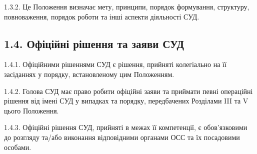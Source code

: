     1.3.2. Це Положення визначає мету, принципи, порядок формування, структуру, повноваження, порядок роботи та інші аспекти діяльності СУД.

\subsection*{1.4. Офіційні рішення та заяви СУД}
    1.4.1. Офіційними рішеннями СУД є рішення, прийняті колегіально на її засіданнях у порядку, встановленому цим Положенням.

    1.4.2. Голова СУД має право робити офіційні заяви та приймати певні операційні рішення від імені СУД у випадках та порядку, передбачених Розділами III та V цього Положення.

    1.4.3. Офіційні рішення СУД, прийняті в межах її компетенції, є обов'язковими до розгляду та/або виконання відповідними органами ОСС та їх посадовими особами. 